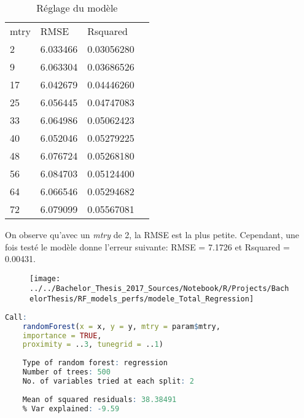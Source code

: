 \begin{table}[H]
	\centering
	\caption{Réglage du modèle}
	\label{RF_Total_Resampling}
	\begin{tabular}{llll}
		mtry & RMSE     & Rsquared     \\
		2    & 6.033466 & 0.03056280   \\
		9    & 6.063304 & 0.03686526   \\
		17   & 6.042679 & 0.04446260   \\
		25   & 6.056445 & 0.04747083   \\
		33   & 6.064986 & 0.05062423   \\
		40   & 6.052046 & 0.05279225   \\
		48   & 6.076724 & 0.05268180   \\
		56   & 6.084703 & 0.05124400   \\
		64   & 6.066546 & 0.05294682   \\
		72   & 6.079099 & 0.05567081    
	\end{tabular}
\end{table}

\noindent On observe qu'avec un \textit{mtry} de 2, la RMSE est la plus petite. Cependant, une fois testé le modèle donne l'erreur suivante: RMSE = 7.1726 et Rsquared = 0.00431. 


\begin{figure}[H]
	\centering
	\texttt{[image: ../../Bachelor\_Thesis\_2017\_Sources/Notebook/R/Projects/BachelorThesis/RF\_models\_perfs/modele\_Total\_Regression]}
	\caption{}
	\label{fig:modeletotalregression}
\end{figure}

\begin{minipage}{\linewidth}
	
	\begin{lstlisting}[showstringspaces=false,language=R, caption={Test du modèle de classification},captionpos=b]
	Call:
	randomForest(x = x, y = y, mtry = param$mtry, 
	importance = TRUE,
	proximity = ..3, tunegrid = ..1) 
	
	Type of random forest: regression
	Number of trees: 500
	No. of variables tried at each split: 2
	
	Mean of squared residuals: 38.38491
	% Var explained: -9.59
	
	\end{lstlisting}
\end{minipage}


